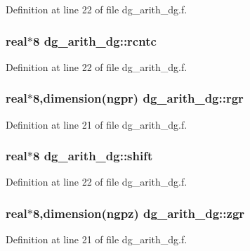 Definition at line 22 of file dg\_\-arith\_\-dg.f.\hypertarget{namespacedg__arith__dg_3dc865564702fd81046c19f0a8f35140}{
\subsubsection[rcntc]{\setlength{\rightskip}{0pt plus 5cm}real$\ast$8 {\bf dg\_\-arith\_\-dg::rcntc}}}
\label{namespacedg__arith__dg_3dc865564702fd81046c19f0a8f35140}




Definition at line 22 of file dg\_\-arith\_\-dg.f.\hypertarget{namespacedg__arith__dg_102091a4aff5243e0e79f2a5e5cfffe2}{
\subsubsection[rgr]{\setlength{\rightskip}{0pt plus 5cm}real$\ast$8,dimension(ngpr) {\bf dg\_\-arith\_\-dg::rgr}}}
\label{namespacedg__arith__dg_102091a4aff5243e0e79f2a5e5cfffe2}




Definition at line 21 of file dg\_\-arith\_\-dg.f.\hypertarget{namespacedg__arith__dg_e54e3bfed258b16e900ebe885e898537}{
\subsubsection[shift]{\setlength{\rightskip}{0pt plus 5cm}real$\ast$8 {\bf dg\_\-arith\_\-dg::shift}}}
\label{namespacedg__arith__dg_e54e3bfed258b16e900ebe885e898537}




Definition at line 22 of file dg\_\-arith\_\-dg.f.\hypertarget{namespacedg__arith__dg_8a5f886abc8b62b69d48cfd735cfd10b}{
\subsubsection[zgr]{\setlength{\rightskip}{0pt plus 5cm}real$\ast$8,dimension(ngpz) {\bf dg\_\-arith\_\-dg::zgr}}}
\label{namespacedg__arith__dg_8a5f886abc8b62b69d48cfd735cfd10b}




Definition at line 21 of file dg\_\-arith\_\-dg.f.